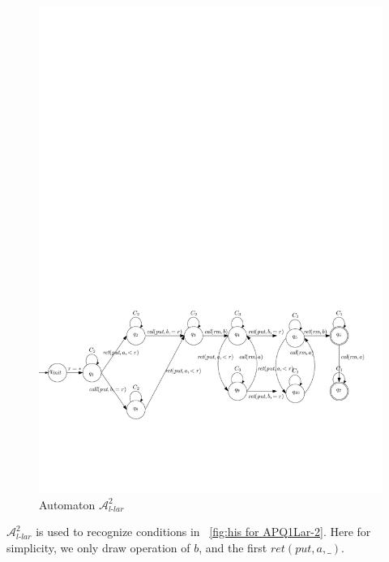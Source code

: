 \begin{figure}[htbp]
  \centering
  \includegraphics[width=1 \textwidth]{figures/PIC_AUTO_PQ1Lar-prpr.pdf}
  \caption{Automaton $\mathcal{A}_{\textit{l-lar}}^2$}
  \label{fig:automata APQ1Lar-2}
\end{figure}


$\mathcal{A}_{\textit{l-lar}}^2$ is used to recognize conditions in \figurename~\ref{fig:his for APQ1Lar-2}. Here for simplicity, we only draw operation of $b$, and the first $\textit{ret}(\textit{put},a,\_)$.


